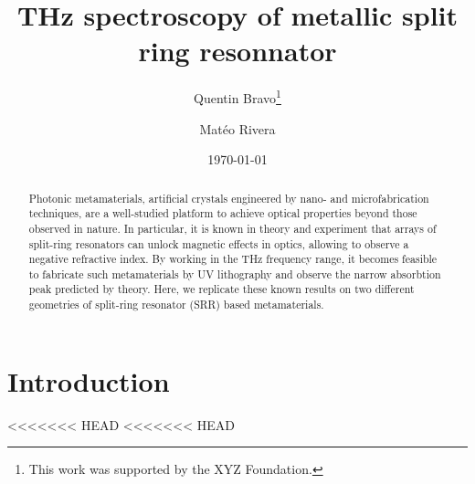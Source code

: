 \documentclass[aps,prb,twocolumn,groupedaddress]{revtex4-2}
\begin{document}
\title{THz spectroscopy of metallic split ring resonnator}

\author{Quentin Bravo\thanks{This work was supported by the XYZ Foundation.}}

\author{Matéo Rivera}



\date{\today}

\begin{abstract}
Photonic metamaterials, artificial crystals engineered by nano- and microfabrication techniques, are a well-studied platform to achieve optical properties beyond those observed in nature.
In particular, it is known in theory and experiment that arrays of split-ring resonators can unlock magnetic effects in optics, allowing to observe a negative refractive index\cite{lindenPhotonicMetamaterialsMagnetism2006a}.
By working in the THz frequency range, it becomes feasible to fabricate such metamaterials by UV lithography and observe the narrow absorbtion peak predicted by theory.
Here, we replicate these known results on two different geometries of split-ring resonator (SRR) based metamaterials.
\end{abstract}


\maketitle

\section{Introduction}
<<<<<<< HEAD
<<<<<<< HEAD
\cite{PrinciplesTerahertzScience2009}
\cite{neuTutorialIntroductionTerahertz2018}
\cite{lindenPhotonicMetamaterialsMagnetism2006a}
\\
\end{document}
